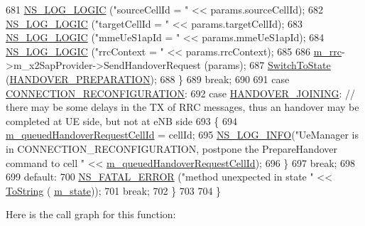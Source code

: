 \begin{DoxyCode}
681         \hyperlink{group__logging_ga88acd260151caf2db9c0fc84997f45ce}{NS\_LOG\_LOGIC} (\textcolor{stringliteral}{"sourceCellId = "} << params.sourceCellId);
682         \hyperlink{group__logging_ga88acd260151caf2db9c0fc84997f45ce}{NS\_LOG\_LOGIC} (\textcolor{stringliteral}{"targetCellId = "} << params.targetCellId);
683         \hyperlink{group__logging_ga88acd260151caf2db9c0fc84997f45ce}{NS\_LOG\_LOGIC} (\textcolor{stringliteral}{"mmeUeS1apId = "} << params.mmeUeS1apId);
684         \hyperlink{group__logging_ga88acd260151caf2db9c0fc84997f45ce}{NS\_LOG\_LOGIC} (\textcolor{stringliteral}{"rrcContext   = "} << params.rrcContext);
685 
686         \hyperlink{classns3_1_1UeManager_ab4405e9f354c66e7c1a4c95832290f5b}{m\_rrc}->m\_x2SapProvider->SendHandoverRequest (params);
687         \hyperlink{classns3_1_1UeManager_af2b5ad90fc6f16ffc4a91fbe8a522472}{SwitchToState} (\hyperlink{classns3_1_1UeManager_a2f4085fdd18d7125c27da44a5b8b6808af12d34cff237916f8322a4b1031ceeda}{HANDOVER\_PREPARATION});
688       \}
689       \textcolor{keywordflow}{break};
690 
691     \textcolor{keywordflow}{case} \hyperlink{classns3_1_1UeManager_a2f4085fdd18d7125c27da44a5b8b6808abd13cee86acc2cb3c04241dec919c73f}{CONNECTION\_RECONFIGURATION}:
692     \textcolor{keywordflow}{case} \hyperlink{classns3_1_1UeManager_a2f4085fdd18d7125c27da44a5b8b6808a093669f7255c35aa11645ba004a896ea}{HANDOVER\_JOINING}: \textcolor{comment}{// there may be some delays in the TX of RRC messages, thus an
       handover may be completed at UE side, but not at eNB side}
693       \{
694         \hyperlink{classns3_1_1UeManager_a70f73047c76f4fd1be2cc3665c381704}{m\_queuedHandoverRequestCellId} = cellId;
695         \hyperlink{group__logging_gafbd73ee2cf9f26b319f49086d8e860fb}{NS\_LOG\_INFO}(\textcolor{stringliteral}{"UeManager is in CONNECTION\_RECONFIGURATION, postpone the PrepareHandover
       command to cell "} << \hyperlink{classns3_1_1UeManager_a70f73047c76f4fd1be2cc3665c381704}{m\_queuedHandoverRequestCellId});
696       \}
697       \textcolor{keywordflow}{break};
698 
699     \textcolor{keywordflow}{default}:
700       \hyperlink{group__fatal_ga5131d5e3f75d7d4cbfd706ac456fdc85}{NS\_FATAL\_ERROR} (\textcolor{stringliteral}{"method unexpected in state "} << \hyperlink{namespacens3_a3d1f7e1bec1972e2ae8d64673fcfcd9c}{ToString} (
      \hyperlink{classns3_1_1UeManager_aaed4b2490297cb912e743084f1a27b08}{m\_state}));
701       \textcolor{keywordflow}{break};
702     \}
703 
704 \}
\end{DoxyCode}


Here is the call graph for this function\+:




